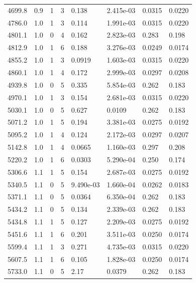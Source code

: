 \documentclass[preview]{standalone}
\begin{document}
{{{\begin{tabular}{L{1.2cm}C{1.2cm} C{0.3cm}C{0.5cm} C{1.4cm}C{1.4cm} C{1.4cm}C{1.4cm}}
  4699.8  &   0.9  & 1     &  3 &  0.138  & 2.415e-03  & 0.0315 &  0.0220   \\ 
  4786.0  &   1.0  & 1     &  3 &  0.114  & 1.991e-03  & 0.0315 &  0.0220   \\ 
  4801.1  &   1.0  & 0     &  4 &  0.162  & 2.823e-03  & 0.283 &  0.198   \\ 
  4812.9  &   1.0  & 1     &  6 &  0.188  & 3.276e-03  & 0.0249 &  0.0174   \\ 
  4855.2  &   1.0  & 1     &  3 &  0.0919  & 1.603e-03  & 0.0315 &  0.0220   \\ 
  4860.1  &   1.0  & 1     &  4 &  0.172  & 2.999e-03  & 0.0297 &  0.0208   \\ 
  4939.8  &   1.0  & 0     &  5 &  0.335  & 5.854e-03  & 0.262 &  0.183   \\ 
  4970.1  &   1.0  & 1     &  3 &  0.154  & 2.681e-03  & 0.0315 &  0.0220   \\ 
  5030.1  &   1.0  & 0     &  5 &  0.627  & 0.0109  & 0.262 &  0.183   \\ 
  5071.2  &   1.0  & 1     &  5 &  0.194  & 3.381e-03  & 0.0275 &  0.0192   \\ 
  5095.2  &   1.0  & 1     &  4 &  0.124  & 2.172e-03  & 0.0297 &  0.0207   \\ 
  5142.8  &   1.0  & 1     &  4 &  0.0665  & 1.160e-03  & 0.297 &  0.208   \\ 
  5220.2  &   1.0  & 1     &  6 &  0.0303  & 5.290e-04  & 0.250 &  0.174   \\ 
  5306.6  &   1.1  & 1     &  5 &  0.154  & 2.687e-03  & 0.0275 &  0.0192   \\ 
  5340.5  &   1.1  & 0     &  5 &  9.490e-03  & 1.660e-04  & 0.0262 &  0.0183   \\ 
  5371.1  &   1.1  & 0     &  5 &  0.0364  & 6.350e-04  & 0.262 &  0.183   \\ 
  5434.2  &   1.1  & 0     &  5 &  0.134  & 2.339e-03  & 0.262 &  0.183   \\ 
  5434.8  &   1.1  & 1     &  5 &  0.127  & 2.209e-03  & 0.0275 &  0.0192   \\ 
  5451.6  &   1.1  & 1     &  6 &  0.201  & 3.511e-03  & 0.0250 &  0.0174   \\ 
  5599.4  &   1.1  & 1     &  3 &  0.271  & 4.735e-03  & 0.0315 &  0.0220   \\ 
  5607.5  &   1.1  & 1     &  6 &  0.105  & 1.828e-03  & 0.0250 &  0.0174   \\ 
  5733.0  &   1.1  & 0     &  5 &  2.17  & 0.0379  & 0.262 &  0.183   \\ 

\end{tabular}}}}
\end{document}
